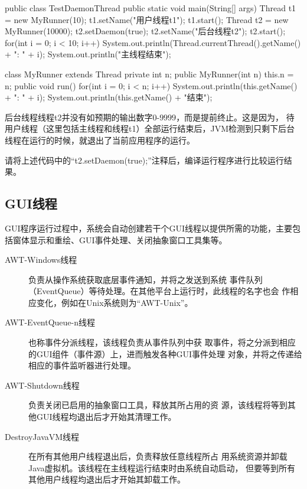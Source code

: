 \begin{javaCode}
public class TestDaemonThread {
  public static void main(String[] args) {
    Thread t1 = new MyRunner(10);
    t1.setName("用户线程t1");
    t1.start();
    Thread t2 = new MyRunner(10000);
    t2.setDaemon(true);
    t2.setName("后台线程t2");
    t2.start();
    for(int i = 0; i < 10; i++) {
      System.out.println(Thread.currentThread().getName() + ": " + i);
    }
    System.out.println("主线程结束");
  }
}

class MyRunner extends Thread {
  private int n;
  public MyRunner(int n) {
    this.n = n;
  }
  public void run() {
    for(int i = 0; i < n; i++) {
      System.out.println(this.getName() + ": " + i);
    }
    System.out.println(this.getName() + "结束");
  }
}  
\end{javaCode}


后台线程线程t2并没有如预期的输出数字$0$-$9999$，而是提前终止。这是因为，
待用户线程（这里包括主线程和线程t1）全部运行结束后，JVM检测到只剩下后台
线程在运行的时候，就退出了当前应用程序的运行。

请将上述代码中的“t2.setDaemon(true);”注释后，编译运行程序进行比较运行结果。


\subsection{GUI线程}

GUI程序运行过程中，系统会自动创建若干个GUI线程以提供所需的功能，主要包
括{\Blue\hei 窗体显示和重绘、GUI事件处理、关闭抽象窗口工具集等}。

\begin{description}
\item[AWT-Windows线程] 负责从操作系统获取底层事件通知，并将之发送到系统
  事件队列（EventQueue）等待处理。在其他平台上运行时，此线程的名字也会
  作相应变化，例如在Unix系统则为“AWT-Unix”。
\item[AWT-EventQueue-n线程] 也称事件分派线程，该线程负责从事件队列中获
  取事件，将之分派到相应的GUI组件（事件源）上，进而触发各种GUI事件处理
  对象，并将之传递给相应的事件监听器进行处理。
\item[AWT-Shutdown线程] 负责关闭已启用的抽象窗口工具，释放其所占用的资
  源，该线程将等到其他GUI线程均退出后才开始其清理工作。
\item[DestroyJavaVM线程] 在所有其他用户线程退出后，负责释放任意线程所占
  用系统资源并卸载Java虚拟机。该线程在主线程运行结束时由系统自动启动，
  但要等到所有其他用户线程均退出后才开始其卸载工作。
\end{description}

